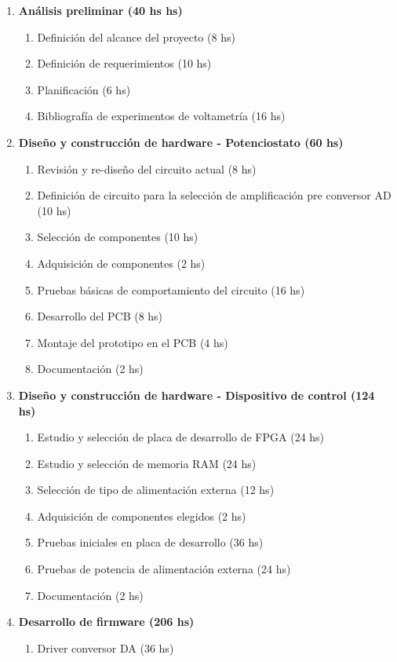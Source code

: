 \documentclass[11pt]{charter}
\begin{document}
\begin{enumerate}
\item \textbf{Análisis preliminar (40 hs hs)} 
	\begin{enumerate}
		\item Definición del alcance del proyecto (8 hs)
		\item Definición de requerimientos (10 hs)
		\item Planificación (6 hs)
		\item Bibliografía de experimentos de voltametría (16 hs)
	\end{enumerate}
\item \textbf{Diseño y construcción de hardware - Potenciostato (60 hs)}
	\begin{enumerate}
		\item Revisión y re-diseño del circuito actual (8 hs)
		\item Definición de circuito para la selección de amplificación pre conversor AD (10 hs)
		\item Selección de componentes (10 hs)
		\item Adquisición de componentes (2 hs)
		\item Pruebas básicas de comportamiento del circuito (16 hs)
		\item Desarrollo del PCB (8 hs)
		\item Montaje del prototipo en el PCB (4 hs)
		\item Documentación (2 hs)
	\end{enumerate}
\item \textbf{Diseño y construcción de hardware - Dispositivo de control (124 hs)}
	\begin{enumerate}
		\item Estudio y selección de placa de desarrollo de FPGA (24 hs)
		\item Estudio y selección de memoria RAM (24 hs)
		\item Selección de tipo de alimentación externa (12 hs)
		\item Adquisición de componentes elegidos (2 hs)
		\item Pruebas iniciales en placa de desarrollo (36 hs)
		\item Pruebas de potencia de alimentación externa (24 hs)
		\item Documentación (2 hs)
	\end{enumerate}
\item \textbf{Desarrollo de firmware (206 hs)}
	\begin{enumerate}
		\item Driver conversor DA (36 hs)

\end{enumerate}
\end{enumerate}
\end{document}
